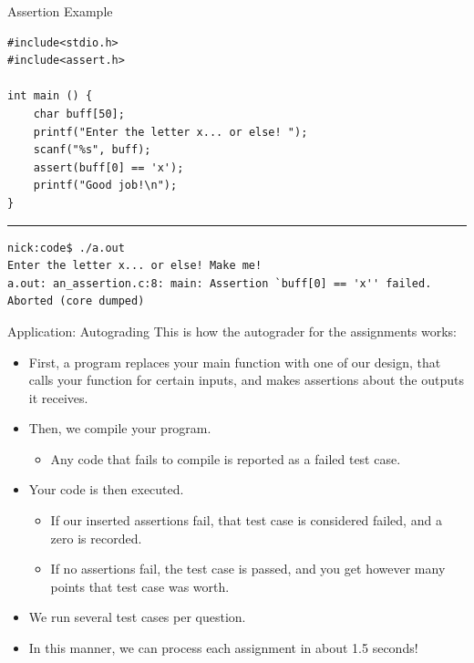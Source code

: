\documentclass[11pt]{beamer}
\begin{document}
\begin{frame}[fragile=singleslide]{Assertion Example}
\begin{lstlisting}[style=C]
#include<stdio.h>
#include<assert.h>

int main () {
	char buff[50];
	printf("Enter the letter x... or else! ");
	scanf("%s", buff);
	assert(buff[0] == 'x');
	printf("Good job!\n");
}	
\end{lstlisting}
\hrule
\begin{lstlisting}[style=terminal]
nick:code$ ./a.out 
Enter the letter x... or else! Make me!
a.out: an_assertion.c:8: main: Assertion `buff[0] == 'x'' failed.
Aborted (core dumped)
\end{lstlisting}
\end{frame}

\begin{frame}{Application: Autograding}
This is how the autograder for the assignments works:
\begin{itemize}
\item First, a program replaces your main function with one of our design, that calls your function for certain inputs, and makes assertions about the outputs it receives.  
\item Then, we compile your program.  
\begin{itemize}
\item Any code that fails to compile is reported as a failed test case.
\end{itemize}
\item Your code is then executed.  
\begin{itemize}
\item If our inserted assertions fail, that test case is considered failed, and a zero is recorded.
\end{itemize}
\begin{itemize}
\item If no assertions fail, the test case is passed, and you get however many points that test case was worth.
\end{itemize}
\item We run several test cases per question.  
\item In this manner, we can process each assignment in about 1.5 seconds!
\end{itemize}
\end{frame}
\end{document}
